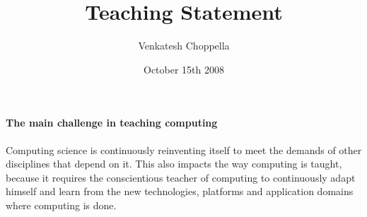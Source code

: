 \documentclass[
9pt, 
]{article}
\begin{document}
\title{Teaching Statement}
\author{Venkatesh Choppella}
\date{October 15th 2008}
\maketitle







\paragraph{The main challenge in teaching computing}
Computing science is continuously reinventing itself to meet
the demands of other disciplines that depend on it.  This
also impacts the way computing is taught, because it
requires the conscientious teacher of computing to
continuously adapt himself and learn from the new
technologies, platforms and application domains where
computing is done.
\end{document}
